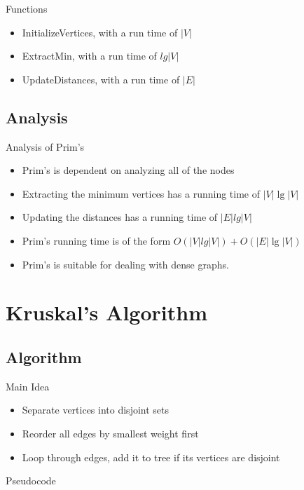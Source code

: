 \documentclass{beamer}
\begin{document}
\begin{frame}{Functions}
    \begin{itemize}
    \item InitializeVertices, with a run time of $|V|$
    \item ExtractMin, with a run time of $lg|V|$
    \item UpdateDistances, with a run time of $|E|$
    \end{itemize}
\end{frame}

\subsection{Analysis}
\begin{frame}{Analysis of Prim's}
    \begin{itemize}
    \item Prim's is dependent on analyzing all of the nodes
    \item Extracting the minimum vertices has a running time of $|V|\lg|V|$
    \item Updating the distances has a running time of $|E|lg|V|$ 
    \item Prim's running time is of the form $O(|V|lg|V|) + O(|E|\lg|V|)$
    \item Prim's is suitable for dealing with dense graphs.
    \end{itemize}
\end{frame}


\section{Kruskal's Algorithm}\frame{\sectionpage}
\subsection{Algorithm}
\begin{frame}{Main Idea}
    \begin{itemize}
    \item Separate vertices into disjoint sets
    \item Reorder all edges by smallest weight first
    \item Loop through edges, add it to tree if its vertices are disjoint
    \end{itemize}
\end{frame}


\begin{frame}{Pseudocode}
\vkruskal
\end{frame}
\end{document}
